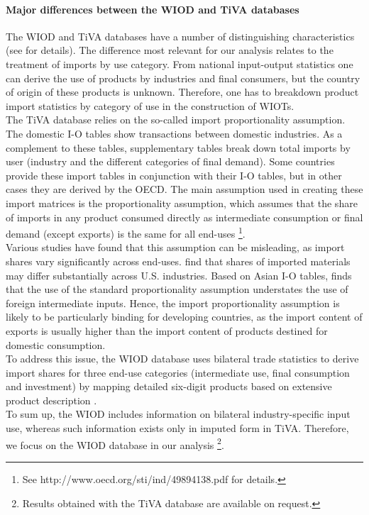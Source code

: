 \documentclass[11pt,a4paper]{article}
\begin{document}
\paragraph{Major differences between the WIOD and TiVA databases}
The WIOD and TiVA databases have a number of distinguishing characteristics (see \cite{Timmer2015} for details). The difference most relevant for our analysis relates to the treatment of imports by use category. From national input-output statistics one can derive the use of products by industries and final consumers, but the country of origin of these products is unknown. Therefore, one has to breakdown product import statistics by category of use in the construction of WIOTs.\\
The TiVA database relies on the so-called import proportionality assumption. The domestic I-O tables show transactions between domestic industries. As a complement to these tables, supplementary tables break down total imports by user (industry and the different categories of final demand). Some countries provide these import tables in conjunction with their I-O tables, but in other cases they are derived by the OECD. The main assumption used in creating these import matrices is the proportionality assumption, which assumes that the share of imports in any product consumed directly as intermediate consumption or final demand (except exports) is the same for all end-uses  \footnote{See http://www.oecd.org/sti/ind/49894138.pdf for details.}.\\
Various studies have found that this assumption can be misleading, as import shares vary significantly across end-uses. \cite{Feenstra2012} find that shares of imported materials may differ substantially across U.S. industries. Based on Asian I-O tables, \cite{Puzzello2012} finds that the use of the standard proportionality assumption understates the use of foreign intermediate inputs. Hence, the import proportionality assumption is likely to be particularly binding for developing countries, as the import content of exports is usually higher than the import content of products destined for domestic consumption.\\
To address this issue, the WIOD database uses bilateral trade statistics to derive import shares for three end-use categories (intermediate use, final consumption and investment) by mapping detailed six-digit products based on extensive product description \citep{Dietzenbacher2013}.\\
To sum up, the WIOD includes information on bilateral industry-specific input use, whereas such information exists only in imputed form in TiVA. Therefore, we focus on the WIOD database in our analysis \footnote{Results obtained with the TiVA database are available on request.}. 
\end{document}
